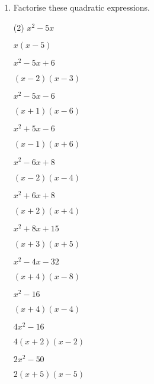 \begin{enumerate} [leftmargin=0cm]
\clearpage    
\item Factorise these quadratic expressions.
\begin{tasks}[label=(\alph*), after-item-skip=2pt,after-skip=3pt, label-width=4ex](2)
    \task  $ x^2 -5x                               $  \\  \begin{envAnswer} $  x(x-5)            $ \end{envAnswer}
    \task  $ x^2 -5x +6                            $  \\  \begin{envAnswer} $  (x-2)(x-3)        $ \end{envAnswer}
    \task  $ x^2 -5x -6                            $  \\  \begin{envAnswer} $  (x+1)(x-6)        $ \end{envAnswer}
    \task  $ x^2 +5x -6                            $  \\  \begin{envAnswer} $  (x-1)(x+6)        $ \end{envAnswer}
    \task  $ x^2 -6x +8                            $  \\  \begin{envAnswer} $  (x-2)(x-4)        $ \end{envAnswer}
    \task  $ x^2 +6x +8                            $  \\  \begin{envAnswer} $  (x+2)(x+4)        $ \end{envAnswer}
    \task  $ x^2 +8x +15                           $  \\  \begin{envAnswer} $  (x+3)(x+5)        $ \end{envAnswer}
    \task  $ x^2 -4x -32                           $  \\  \begin{envAnswer} $  (x+4)(x-8)        $ \end{envAnswer}
    \task  $ x^2 -16                               $  \\  \begin{envAnswer} $  (x+4)(x-4)        $ \end{envAnswer}
    \task  $ 4x^2 -16                              $  \\  \begin{envAnswer} $  4(x+2)(x-2)       $ \end{envAnswer}
    \task  $ 2x^2 -50                              $  \\  \begin{envAnswer} $  2(x+5)(x-5)       $ \end{envAnswer}
\end{tasks}    



\end{enumerate}

